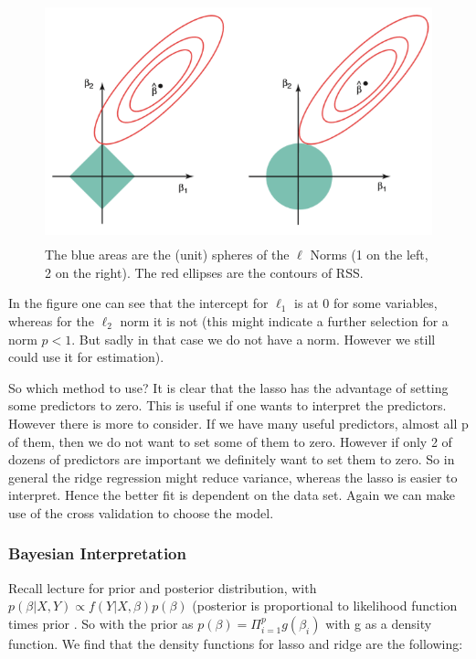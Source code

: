 \documentclass{article}
\begin{document}
\begin{figure}[ht]
    \centering
    \includegraphics[height=70mm]{l1_l2_comparison.png}
    \caption{The blue areas are the (unit) spheres of the $\ell$ Norms (1 on the left, 2 on the right). The red ellipses are the contours of RSS.}
    \label{fig:comparing_l_norms}
\end{figure}

In the figure one can see that the intercept for $\ell_1$ is at 0 for some variables, whereas for the $\ell_2$ norm it is not (this might indicate a further selection for a norm $p<1$. But sadly in that case we do not have a norm. However we still could use it for estimation). 
 
 So which method to use?
 It is clear that the lasso has the advantage of setting some predictors to zero. This is useful if one wants to interpret the predictors. However there is more to consider. If we have many useful predictors, almost all p of them, then we do not want to set some of them to zero. However if only 2 of dozens of predictors are important we definitely want to set them to zero. So in general the ridge regression might reduce variance, whereas the lasso is easier to interpret. Hence the better fit is dependent on the data set. Again we can make use of the cross validation to choose the model. 
 
 
 \subsubsection{Bayesian Interpretation}
 Recall lecture for prior and posterior distribution, with $p(\beta|X,Y) \propto
 f(Y|X,\beta)p(\beta)$ (posterior is proportional to likelihood function times prior  \cite{degroot2013probability}.
So with the prior as $p(\beta) = \Pi _{i=1}^p g(\beta_i)$ with g as a density function. We find that the density functions for lasso and ridge are the following: 
\end{document}
